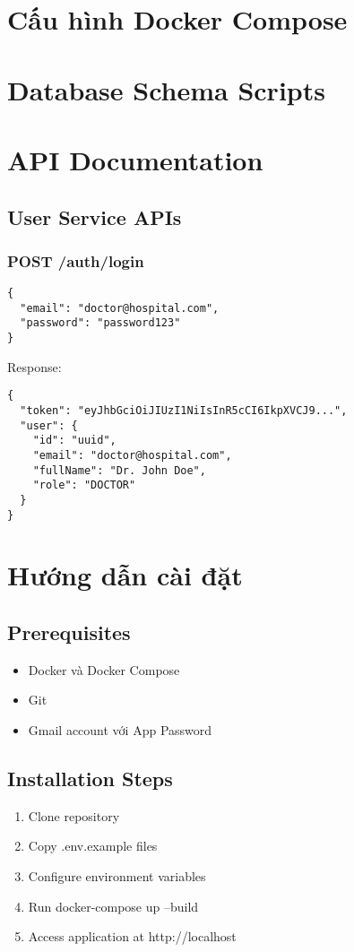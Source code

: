 \documentclass[12pt,a4paper]{report}
\begin{document}
\appendix

\chapter{Cấu hình Docker Compose}

\chapter{Database Schema Scripts}

\chapter{API Documentation}
\section{User Service APIs}
\subsection{POST /auth/login}
\begin{lstlisting}[language=text]
{
  "email": "doctor@hospital.com",
  "password": "password123"
}
\end{lstlisting}

Response:
\begin{lstlisting}[language=text]
{
  "token": "eyJhbGciOiJIUzI1NiIsInR5cCI6IkpXVCJ9...",
  "user": {
    "id": "uuid",
    "email": "doctor@hospital.com",
    "fullName": "Dr. John Doe",
    "role": "DOCTOR"
  }
}
\end{lstlisting}

\chapter{Hướng dẫn cài đặt}
\section{Prerequisites}
\begin{itemize}
    \item Docker và Docker Compose
    \item Git
    \item Gmail account với App Password
\end{itemize}

\section{Installation Steps}
\begin{enumerate}
    \item Clone repository
    \item Copy .env.example files
    \item Configure environment variables
    \item Run docker-compose up --build
    \item Access application at http://localhost
\end{enumerate}
\end{document}
